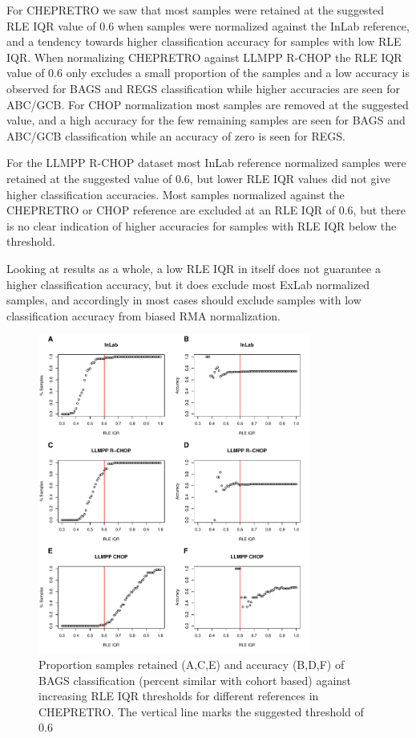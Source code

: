 For CHEPRETRO we saw that most samples were retained at the suggested RLE IQR value of 0.6 when samples were normalized against the InLab reference, and a tendency towards higher classification accuracy for samples with low RLE IQR. When normalizing CHEPRETRO against LLMPP R-CHOP the RLE IQR value of 0.6 only excludes a small proportion of the samples and a low accuracy is observed for BAGS and REGS classification while higher accuracies are seen for ABC/GCB. For CHOP normalization most samples are removed at the suggested value, and a high accuracy for the few remaining samples are seen for BAGS and ABC/GCB classification while an accuracy of zero is seen for REGS. 

For the LLMPP R-CHOP dataset most InLab reference normalized samples were retained at the suggested value of 0.6, but lower RLE IQR values did not give higher classification accuracies. Most samples normalized against the CHEPRETRO or CHOP reference are excluded at an RLE IQR of 0.6, but there is no clear indication of higher accuracies for samples with RLE IQR below the threshold.

Looking at results as a whole, a low RLE IQR in itself does not guarantee a higher classification accuracy, but it does exclude most ExLab normalized samples, and accordingly in most cases should exclude samples with low classification accuracy from biased RMA normalization.

\begin{figure}
	\begin{center}
		\includegraphics[width=0.8\textwidth]{figures/chep_rle_classification_bags.pdf}
	\end{center}
	\caption{Proportion samples retained (A,C,E) and accuracy (B,D,F) of BAGS classification (percent similar with cohort based) against increasing RLE IQR thresholds for different references in CHEPRETRO. The vertical line marks the suggested threshold of 0.6}
	\label{fig:chep_rle_clas_bags}
\end{figure}


